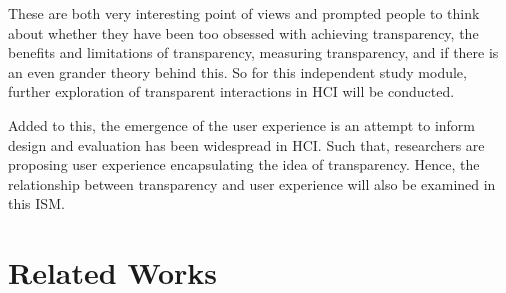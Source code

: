 \documentclass{acm_proc_article-sp}
\begin{document}
These are both very interesting point of views and prompted people to
think about whether they have been too obsessed with achieving
transparency, the benefits and limitations of transparency, measuring
transparency, and if there is an even grander theory behind this. So
for this independent study module, further exploration of transparent
interactions in HCI will be conducted.

Added to this, the emergence of the user experience is an attempt to
inform design and evaluation has been widespread in HCI. Such that,
researchers are proposing user experience encapsulating the idea of
transparency. Hence, the relationship between transparency and user
experience will also be examined in this ISM.

\section{Related Works}



\end{document}
